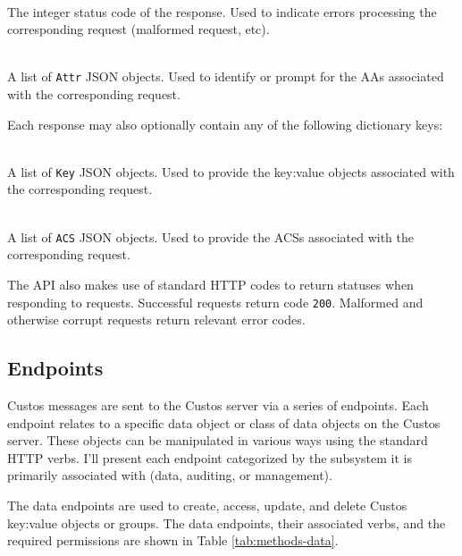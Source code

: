 \begin{packed_desc}
\item[\texttt{Status}] \hfill \\ The integer status code of the
  response. Used to indicate errors processing the corresponding
  request (malformed request, etc).
\item[\texttt{Attrs}] \hfill \\ A list of \texttt{Attr} JSON
  objects. Used to identify or prompt for the AAs associated with the
  corresponding request.
\end{packed_desc}

\noindent
Each response may also optionally contain any of the following
dictionary keys:

\begin{packed_desc}
\item[\texttt{Keys}] \hfill \\ A list of \texttt{Key} JSON
  objects. Used to provide the key:value objects associated with the
  corresponding request.
\item[\texttt{ACSs}] \hfill \\ A list of \texttt{ACS} JSON
  objects. Used to provide the ACSs associated with the corresponding
  request.
\end{packed_desc}

The API also makes use of standard HTTP codes to return statuses when
responding to requests. Successful requests return code
\texttt{200}. Malformed and otherwise corrupt requests return relevant
error codes.

\subsection{Endpoints}

Custos messages are sent to the Custos server via a series of
endpoints. Each endpoint relates to a specific data object or class
of data objects on the Custos server. These objects can be manipulated
in various ways using the standard HTTP verbs. I'll present each
endpoint categorized by the subsystem it is primarily associated with
(data, auditing, or management).

The data endpoints are used to create, access, update, and delete
Custos key:value objects or groups. The data endpoints, their
associated verbs, and the required permissions are shown in Table
\ref{tab:methods-data}.

